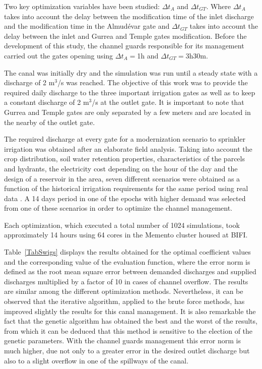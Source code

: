 \documentclass[review,authoryear]{elsarticle}
\begin{document}
Two key optimization variables have been studied: $\Delta t_A$ and
$\Delta t_{GT}$. Where $\Delta t_A$ takes into account the delay between the
modification time of the inlet discharge and the modification time in the
Almudévar gate and $\Delta t_{GT}$ takes into account the delay between the
inlet and Gurrea and Temple gates modification. Before the development of this 
study, the channel guards responsible for its management carried out the gates
opening using $\Delta t_A=$1h and $\Delta t_{GT}=$3h30m.

The canal was initially dry and the simulation was run until a steady state with
a discharge of 2 m$^3$/s was reached. The objective of this work was to provide
the required daily discharge to the three important irrigation gates as well as
to keep a constant discharge of 2 m$^3$/s at the outlet gate. It is important to 
note that Gurrea and Temple gates are only separated by a few meters and are located
in the nearby of the outlet gate.

The required discharge at every gate for a modernization scenario to sprinkler irrigation was obtained after an elaborate 
field analysis. Taking into account the crop distribution, soil water retention properties, 
characteristics of the parcels and hydrants, the electricity cost depending on the hour of the day and the design of a 
reservoir in the area, seven different scenarios were obtained as a function of the historical irrigation requirements for 
the same period using real data \citet{Zapata09}. A 14 days period in one of the epochs with higher demand was selected from
one of these scenarios in order to optimize the channel management.

Each optimization, which executed a total number of 1024 simulations, took 
approximately 14 hours using 64 cores in the Memento cluster housed at BIFI.

Table~\ref{TabSwigs} displays the results obtained for the optimal coefficient
values and the corresponding value of the evaluation function, where the error
norm is defined as the root mean square error between demanded discharges and
supplied discharges multiplied by a factor of 10 in cases of channel overflow.
The results are similar among the different optimization methods.
Nevertheless, it can be observed that the iterative algorithm, applied to the 
brute force methods, has improved slightly the results for this canal management.
It is also remarkable the fact that the genetic algorithm has obtained the best
and the worst of the results, from which it can be deduced that this method
is sensitive to the election of the genetic parameters. With the channel
guards management this error norm is much higher, due not only to a greater error
in the desired outlet discharge but also to a slight overflow in one of the 
spillways of the canal.
\end{document}
